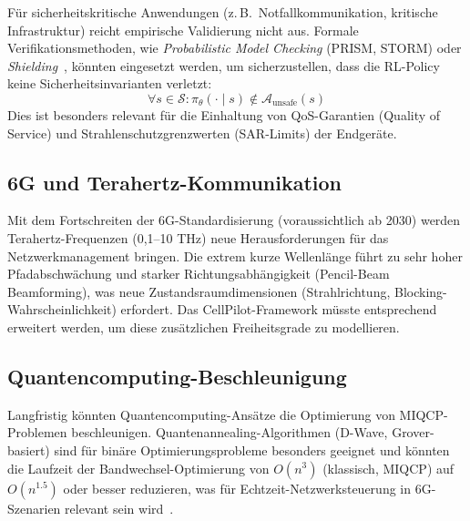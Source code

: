 ﻿\documentclass[a4paper,12pt]{article}
\theoremstyle{definition}
\begin{document}
F\"ur sicherheitskritische Anwendungen (z.\,B.\ Notfallkommunikation, kritische Infrastruktur)
reicht empirische Validierung nicht aus. Formale Verifikationsmethoden, wie
\emph{Probabilistic Model Checking} (PRISM, STORM) oder \emph{Shielding}~\cite{alshiekh2018},
k\"onnten eingesetzt werden, um sicherzustellen, dass die RL-Policy keine
Sicherheitsinvarianten verletzt:
\[
  \forall s \in \mathcal{S}: \pi_\theta(\cdot \mid s) \not\in \mathcal{A}_{\mathrm{unsafe}}(s)
\]
Dies ist besonders relevant f\"ur die Einhaltung von QoS-Garantien (Quality of Service)
und Strahlenschutzgrenzwerten (SAR-Limits) der Endger\"ate.

\subsection{6G und Terahertz-Kommunikation}

Mit dem Fortschreiten der 6G-Standardisierung (voraussichtlich ab 2030) werden
Terahertz-Frequenzen (0{,}1--10 THz) neue Herausforderungen f\"ur das Netzwerkmanagement
bringen. Die extrem kurze Wellenl\"ange f\"uhrt zu sehr hoher Pfadabschw\"achung und
starker Richtungsabh\"angigkeit (Pencil-Beam Beamforming), was neue Zustandsraumdimensionen
(Strahlrichtung, Blocking-Wahrscheinlichkeit) erfordert. Das CellPilot-Framework m\"usste
entsprechend erweitert werden, um diese zus\"atzlichen Freiheitsgrade zu modellieren.

\subsection{Quantencomputing-Beschleunigung}

Langfristig k\"onnten Quantencomputing-Ans\"atze die Optimierung von MIQCP-Problemen
beschleunigen. Quantenannealing-Algorithmen (D-Wave, Grover-basiert) sind f\"ur
bin\"are Optimierungsprobleme besonders geeignet und k\"onnten die Laufzeit der
Bandwechsel-Optimierung von $O(n^3)$ (klassisch, MIQCP) auf $O(n^{1.5})$ oder besser reduzieren,
was f\"ur Echtzeit-Netzwerksteuerung in 6G-Szenarien relevant sein wird~\cite{epp2026q}.
\end{document}
